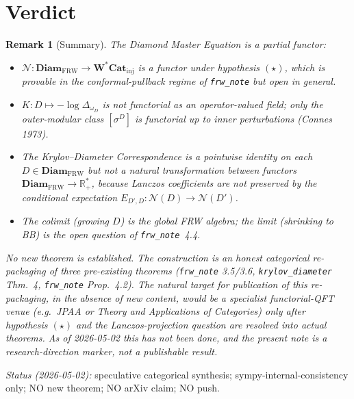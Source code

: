 \documentclass[11pt]{article}
\newtheorem{remark}[theorem]{Remark}
\newcommand{\NN}{\mathcal{N}}
\newcommand{\FRW}{{\mathrm{FRW}}}
\newcommand{\R}{\mathbb{R}}
\newcommand{\Diam}{\mathbf{Diam}_\FRW}
\newcommand{\WCatinj}{\mathbf{W^{*}\!Cat}_{\mathrm{inj}}}
\begin{document}
\section{Verdict}

\begin{remark}[Summary]\label{rem:verdict}
The Diamond Master Equation is a \emph{partial} functor:
\begin{itemize}
\item $\NN:\Diam\to\WCatinj$ is a functor under hypothesis $(\star)$,
which is provable in the conformal-pullback regime of
\texttt{frw\_note} but open in general.
\item $K:D\mapsto-\log\Delta_{\omega_D}$ is \emph{not} functorial as
an operator-valued field; only the outer-modular class $[\sigma^D]$
is functorial up to inner perturbations (Connes 1973).
\item The Krylov--Diameter Correspondence is a \emph{pointwise}
identity on each $D\in\Diam$ but \emph{not} a natural transformation
between functors $\Diam\to\R^*_+$, because Lanczos coefficients are
not preserved by the conditional expectation
$E_{D',D}:\NN(D)\to\NN(D')$.
\item The colimit (growing $D$) is the global FRW algebra; the limit
(shrinking to BB) is the open question of \texttt{frw\_note}~4.4.
\end{itemize}
No new theorem is established. The construction is an honest
categorical re-packaging of three pre-existing theorems
(\texttt{frw\_note} 3.5/3.6, \texttt{krylov\_diameter} Thm.~4,
\texttt{frw\_note} Prop.~4.2). The natural target for publication of
this re-packaging, in the absence of new content, would be a
specialist functorial-QFT venue (e.g.\ JPAA or Theory and
Applications of Categories) only \emph{after} hypothesis $(\star)$
and the Lanczos-projection question are resolved into actual
theorems. As of 2026-05-02 this has not been done, and the present
note is a research-direction marker, not a publishable result.
\end{remark}

\bigskip
\noindent\emph{Status (2026-05-02):} speculative categorical
synthesis; sympy-internal-consistency only; NO new theorem; NO arXiv
claim; NO push.
\end{document}
